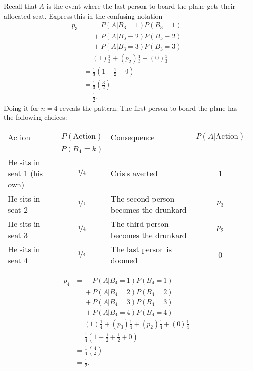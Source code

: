 \documentclass[a4paper]{article}
\begin{document}
Recall that $A$ is the event where the last person to board the plane gets their allocated seat.
Express this in the confusing notation:
\begin{align*}
  p_3
  &=
       \phantom{{} + {}}    P(A|B_3 = 1)P(B_3=1) \\
      &\phantom{{} = {}} +  P(A|B_3 = 2)P(B_3=2) \\
      &\phantom{{} = {}} +  P(A|B_3 = 3)P(B_3=3)
  \\
  &=
  (1)   \frac{1}{3}  +
  (p_2) \frac{1}{3} +
  (0)   \frac{1}{3} \\
& =\frac{1}{3}\left(1 +  \frac{1}{2} + 0\right) \\
& =\frac{1}{3}\left(\frac{3}{2}\right)  \\
& =\frac{1}{2}
\text{.}
\end{align*}
Doing it for $n=4$ reveals the pattern.
The first person to board the plane has the following choices:
\begin{center}
\begin{tabular}{lclc}
\hline
 Action                    & $P(\text{Action})$ &  Consequence                             & $P(A|\text{Action})$ \\
                           & $P(B_4 = k)$       &                                          &               \\
 \hline
He sits in seat 1 (his own)& $\nicefrac{1}{4}$  &  Crisis averted                          & 1\\
He sits in seat 2          & $\nicefrac{1}{4}$  &  The second person becomes the drunkard  & $p_3$\\
He sits in seat 3          & $\nicefrac{1}{4}$  &  The third person becomes the drunkard   & $p_2$\\
He sits in seat 4          & $\nicefrac{1}{4}$  &  The last person is doomed               & 0\\
\hline
\end{tabular}
\end{center}
\begin{align*}
  p_4
      &=  \phantom{{} + {}} P(A|B_4 = 1)P(B_4=1) \\
      &\phantom{{} = {}} +  P(A|B_4 = 2)P(B_4=2) \\
      &\phantom{{} = {}} +  P(A|B_4 = 3)P(B_4=3) \\
      &\phantom{{} = {}} +  P(A|B_4 = 4)P(B_4=4)
  \\
 & =
  (1)   \frac{1}{4} +
  (p_3) \frac{1}{4} +
  (p_2) \frac{1}{4} +
  (0)   \frac{1}{4} \\
& =\frac{1}{4}\left(1 +  \frac{1}{2} + \frac{1}{2} + 0\right) \\
& =\frac{1}{4}\left(\frac{4}{2}\right)  \\
& =\frac{1}{2}
\text{.}
\end{align*}
\end{document}

